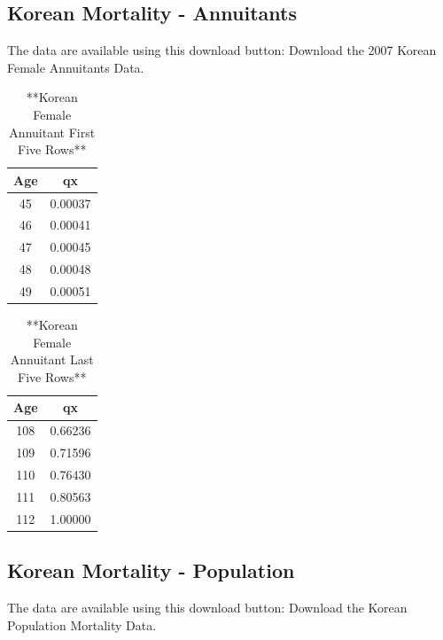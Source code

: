 \documentclass[
]{book}
\begin{document}
\hypertarget{korean-mortality---annuitants}{%
\subsection*{Korean Mortality - Annuitants}\label{korean-mortality---annuitants}}

The data are available using this download button:
Download the 2007 Korean Female Annuitants Data.

\begin{table}

\caption{\label{tab:unnamed-chunk-27}**Korean Female Annuitant First Five Rows**}
\centering
\begin{tabular}[t]{c|c}
\hline
Age & qx\\
\hline
45 & 0.00037\\
\hline
46 & 0.00041\\
\hline
47 & 0.00045\\
\hline
48 & 0.00048\\
\hline
49 & 0.00051\\
\hline
\end{tabular}
\end{table}

\begin{table}

\caption{\label{tab:unnamed-chunk-27}**Korean Female Annuitant Last Five Rows**}
\centering
\begin{tabular}[t]{c|c}
\hline
Age & qx\\
\hline
108 & 0.66236\\
\hline
109 & 0.71596\\
\hline
110 & 0.76430\\
\hline
111 & 0.80563\\
\hline
112 & 1.00000\\
\hline
\end{tabular}
\end{table}

\hypertarget{korean-mortality---population}{%
\subsection*{Korean Mortality - Population}\label{korean-mortality---population}}

The data are available using this download button:
Download the Korean Population Mortality Data.
\end{document}
